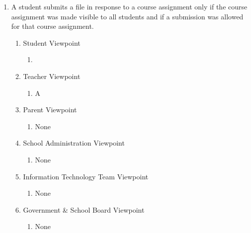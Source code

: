 \documentclass[]{article}
\begin{document}
\begin{enumerate}[{BE}1.]
	\item A student submits a file in response to a course assignment only if the course assignment was made visible to all students and if a submission was allowed for that course assignment.
	\begin{enumerate}[{VP2}.1]
		\item Student Viewpoint
			\begin{enumerate}
				\item
			\end{enumerate}
		\item Teacher Viewpoint
			\begin{enumerate}
				\item A
			\end{enumerate}
		\item Parent Viewpoint
			\begin{enumerate}
				\item None
			\end{enumerate}
		\item School Administration Viewpoint
			\begin{enumerate}
				\item None
			\end{enumerate}
		\item Information Technology Team Viewpoint
			\begin{enumerate}
				\item None
			\end{enumerate}
		\item Government \& School Board Viewpoint
			\begin{enumerate}
				\item None
			\end{enumerate}
	\end{enumerate}


\end{enumerate}
\end{document}
